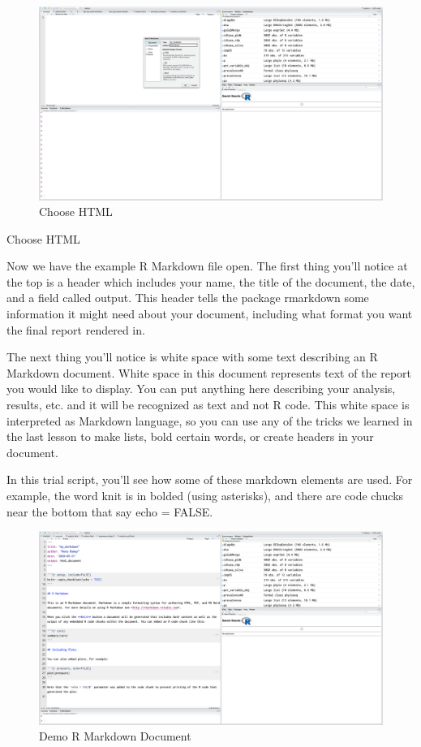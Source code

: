 \documentclass[
]{book}
\begin{document}
\begin{figure}
\centering
\includegraphics{img/mdname.png}
\caption{Choose HTML}
\end{figure}

Choose HTML

Now we have the example R Markdown file open. The first thing you'll notice at the top is a header which includes your name, the title of the document, the date, and a field called output. This header tells the package rmarkdown some information it might need about your document, including what format you want the final report rendered in.

The next thing you'll notice is white space with some text describing an R Markdown document. White space in this document represents text of the report you would like to display. You can put anything here describing your analysis, results, etc. and it will be recognized as text and not R code. This white space is interpreted as Markdown language, so you can use any of the tricks we learned in the last lesson to make lists, bold certain words, or create headers in your document.

In this trial script, you'll see how some of these markdown elements are used. For example, the word knit is in bolded (using asterisks), and there are code chucks near the bottom that say echo = FALSE.

\begin{figure}
\centering
\includegraphics{img/firstmd.png}
\caption{Demo R Markdown Document}
\end{figure}
\end{document}
